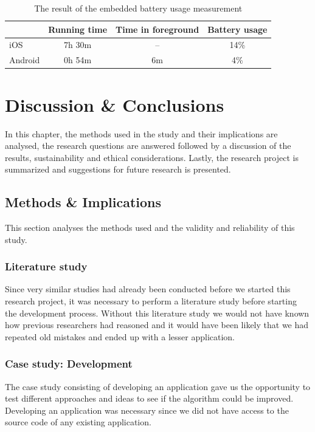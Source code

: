 \documentclass[12pt, a4paper, onecolumn]{article}
\begin{document}
	\begin{table}[H]
		\centering
		\begin{tabular}{|l|c|c|c|}
			\hline
			& Running time & Time in foreground & Battery usage \\ \hline
			iOS     & 7h 30m & -- & 14\%        \\ \hline
			Android & 0h 54m & 6m & 4\%        \\ \hline
		\end{tabular}
		\caption{The result of the embedded battery usage measurement}
		\label{table:battery-embedded}
	\end{table}
	\newpage
	
	\section{Discussion \& Conclusions} \label{section:discussion}
	
	In this chapter, the methods used in the study and their implications are analysed, the research questions are answered followed by a discussion of the results, sustainability and ethical considerations. Lastly, the research project is summarized and suggestions for future research is presented.
	
	\subsection{Methods \& Implications}
	
	This section analyses the methods used and the validity and reliability of this study.
	
	\subsubsection{Literature study}
	
	Since very similar studies had already been conducted before we started this research project, it was necessary to perform a literature study before starting the development process. Without this literature study we would not have known how previous researchers had reasoned and it would have been likely that we had repeated old mistakes and ended up with a lesser application.
	
	\subsubsection{Case study: Development}
	
	The case study consisting of developing an application gave us the opportunity to test different approaches and ideas to see if the algorithm could be improved. Developing an application was necessary since we did not have access to the source code of any existing application.
	
\end{document}
